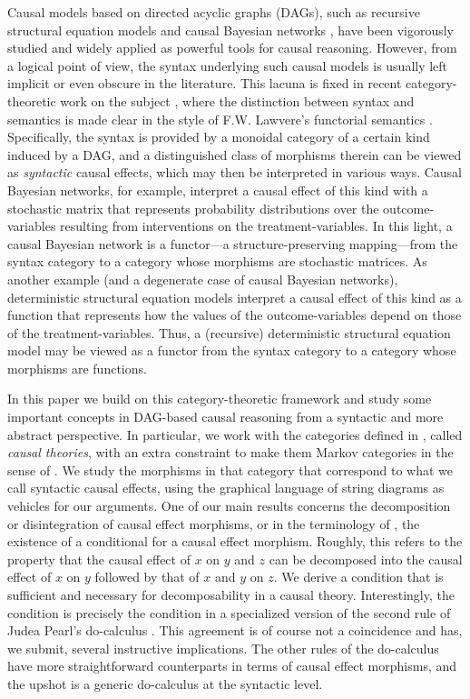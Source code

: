 \documentclass[12pt]{amsart}
\theoremstyle{plain}
\theoremstyle{definition}
\theoremstyle{remark}
\numberwithin{equation}{section}
\theoremstyle{plain}
\newcommand{\0}{\emptyset}
\begin{document}
Causal models based on directed acyclic graphs (DAGs), such as recursive structural equation models \cite{GallesPearl1998, Halpern2000} and causal Bayesian networks \cite{SGS2000, pearl2009causality},  have been vigorously studied and widely applied as powerful tools for causal reasoning.  However,  from a logical point of view,  the syntax underlying such causal models is usually left implicit or even obscure in the literature.  This lacuna is fixed in recent category-theoretic work on the subject \cite{Fong:thesis, jacobs2019causal}, where the distinction between syntax and semantics is made clear in the style of F.W. Lawvere's functorial semantics \cite{lawvere1963functorial}. Specifically, the syntax is provided by a monoidal category of a certain kind induced by a DAG, and a distinguished class of morphisms therein can be viewed as {\it syntactic} causal effects, which may then be interpreted in various ways. Causal Bayesian networks, for example, interpret a causal effect of this kind with a stochastic matrix that represents probability distributions over the outcome-variables resulting from interventions on the treatment-variables. In this light, a causal Bayesian network is a functor---a structure-preserving mapping---from the syntax category to a category whose morphisms are stochastic matrices. As another example (and a degenerate case of causal Bayesian networks), deterministic structural equation models interpret a causal effect of this kind as a function that represents how the values of the outcome-variables depend on those of the treatment-variables. Thus, a (recursive) deterministic structural equation model may be viewed as a functor from the syntax category to a category whose morphisms are functions.

In this paper we build on this category-theoretic framework and study some important concepts in DAG-based causal reasoning from a syntactic and more abstract perspective. In particular, we work with the categories defined in \cite{Fong:thesis}, called {\it causal theories}, with an extra constraint to make them Markov categories in the sense of \cite{fritz2020synthetic}. We study the morphisms in that category that correspond to what we call syntactic causal effects, using the graphical language of string diagrams as vehicles for our arguments. One of our main results concerns the decomposition or disintegration of causal effect morphisms, or in the terminology of \cite{fritz2020synthetic}, the existence of a conditional for a causal effect morphism. Roughly, this refers to the property that the causal effect of $x$ on $y$ and $z$ can be decomposed into the causal effect of $x$ on $y$ followed by that of $x$ and $y$ on $z$. We derive a condition that is sufficient and necessary for decomposability in a causal theory.  Interestingly, the condition is precisely the condition in a specialized version of the second rule of Judea Pearl's do-calculus \cite{pearl2009causality}. This agreement is of course not a coincidence and has, we submit, several instructive implications. The other rules of the do-calculus have more straightforward counterparts in terms of causal effect morphisms, and the upshot is a generic do-calculus at the syntactic level.
\end{document}
